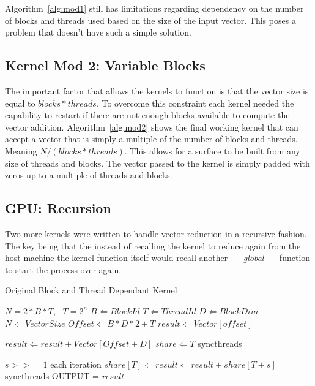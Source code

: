 \documentclass[conference]{IEEEtran}
\begin{document}
Algorithm~\ref{alg:mod1} still has limitations regarding dependency on the number of blocks and threads used based on the size of the input vector. This poses a problem that doesn't have such a simple solution.
\subsection{Kernel Mod 2: Variable Blocks}
The important factor that allows the kernels to function is that the vector size is equal to $blocks*threads$. To overcome this constraint each kernel needed the capability to restart if there are not enough blocks available to compute the vector addition. Algorithm~\ref{alg:mod2} shows the final working kernel that can accept a vector that is simply a multiple of the number of blocks and threads. Meaning $N/(blocks*threads)$. This allows for a surface to be built from any size of threads and blocks. The vector passed to the kernel is simply padded with zeros up to a multiple of threads and blocks.

\subsection{GPU: Recursion}
Two more kernels were written to handle vector reduction in a recursive fashion. The key being that the instead of recalling the kernel to reduce again from the host machine the kernel function itself would recall another \emph{\_\_global\_\_} function to start the process over again.

\begin{algorithm}
  \caption{Original Block and Thread Dependant Kernel}
  \label{alg:original}
  \begin{algorithmic}
    \REQUIRE $N=2*B*T$,~ $T=2^n$
    \STATE $B \Leftarrow BlockId$
    \STATE $T \Leftarrow ThreadId$
    \STATE $D \Leftarrow BlockDim$
    \STATE $N \Leftarrow Vector Size$
    \STATE $Offset \Leftarrow B * D * 2 + T$
    \STATE $result \Leftarrow Vector[offset]$
    
        \STATE $result \Leftarrow result + Vector[Offset + D]$
    \ENDIF
    \STATE $share \Leftarrow T$
    \STATE syncthreads
    
    \STATE $s >>= 1$ each iteration
            \STATE $share[T] \Leftarrow result \Leftarrow result + share[T + s]$
        \ENDIF
        \STATE syncthreads
    \ENDFOR
      \STATE OUTPUT = $result$
    \ENDIF
  \end{algorithmic}
\end{algorithm}
\end{document}
